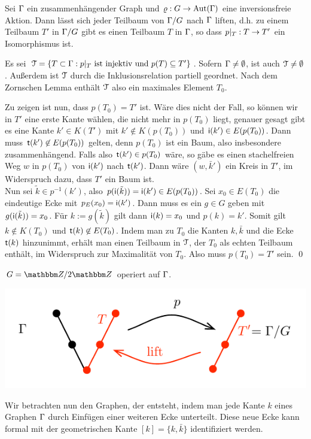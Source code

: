 \documentclass[a4paper, 12pt, twoside]{article}
\begin{document}
\BEM\label{bem_lift}
Sei $\Gamma$ ein zusammenhängender Graph und $\varrho:G\rightarrow\mathrm{Aut}(\Gamma)$
eine inversionsfreie Aktion.
Dann lässt sich jeder Teilbaum von $\Gamma/G$ nach $\Gamma$ liften,
d.h. zu einem Teilbaum $T'$ in $\Gamma/G$ gibt es einen Teilbaum $T$ in
$\Gamma$, so dass $p|_T:T\rightarrow T'$ ein Isomorphismus ist.

\bew Es sei
$\mathcal{T} =\{ T \subset \Gamma : p|_T \text{ ist injektiv und } p(T)\subseteq T' \}$.
Sofern $\Gamma\neq\emptyset$, ist auch $\mathcal{T}\neq\emptyset$.
Außerdem ist $\mathcal{T}$ durch die Inklusionsrelation partiell geordnet.
Nach dem Zornschen Lemma enthält $\mathcal{T}$ also ein maximales Element
$T_0$.

Zu zeigen ist nun, dass $p(T_0)=T'$ ist.
Wäre dies nicht der Fall, so können wir in $T'$ eine erste Kante
wählen, die nicht mehr in $p(T_0)$ liegt, genauer gesagt gibt es eine
Kante $k'\in K(T')$ mit $k'\not\in K(p(T_0))$ und
$\mathsf{i}(k')\in E(p(T_0))$. Dann muss $\mathsf{t}(k')\not\in E(p(T_0))$ gelten,
denn $p(T_0)$ ist ein Baum, also insbesondere zusammenhängend.
Falls also $\mathsf{t}(k')\in p(T_0)$ wäre, so gäbe es einen stachelfreien
Weg $w$ in $p(T_0)$ von $\mathsf{i}(k')$ nach $\mathsf{t}(k')$.
Dann wäre $(w, \bar{k}')$ ein Kreis in $T'$, im Widerspruch dazu,
dass $T'$ ein Baum ist.\\
Nun sei $\tilde{k}\in p^{-1}(k')$, also
$p(\mathsf{i}(\tilde{k}))=\mathsf{i}(k') \in E(p(T_0))$.
Sei $x_0 \in E(T_0)$ die eindeutige Ecke mit $p_E(x_0)=\mathsf{i}(k')$.
Dann muss es ein $g\in G$ geben mit $g(\mathsf{i}(\tilde{k}))=x_0$.
Für $k:=g(\tilde{k})$ gilt dann $\mathsf{i}(k)=x_0$ und $p(k)=k'$.
Somit gilt $k\not\in K(T_0)$ und $\mathsf{t}(k)\not\in E(T_0)$.
Indem man zu $T_0$ die Kanten $k,\bar{k}$ und die Ecke $\mathsf{t}(k)$
hinzunimmt, erhält man einen Teilbaum in $\mathcal{T}$, der $T_0$ als
echten Teilbaum enthält, im Widerspruch zur Maximalität von $T_0$.
Also muss $p(T_0)=T'$ sein.
\qed

\BSP $G=\ZZ/2\ZZ$ operiert auf $\Gamma$.
\begin{center}
	\includegraphics{grugraImages/lift}
\end{center}

Wir betrachten nun den Graphen, der entsteht, indem man jede Kante $k$
eines Graphen $\Gamma$ durch Einfügen einer weiteren
Ecke unterteilt. Diese neue Ecke kann formal mit der geometrischen
Kante $[k]=\{k,\bar{k}\}$ identifiziert werden.
\end{document}
